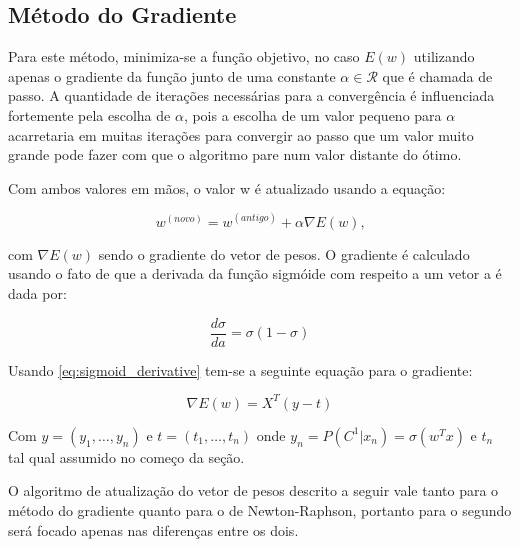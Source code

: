 \subsection{Método do Gradiente}\label{subsec:grad_descent}

Para este método, minimiza-se a função objetivo, no caso $E(w)$ utilizando apenas o gradiente
da função junto de uma constante $\alpha \in \mathcal{R}$ que é chamada de passo.
A quantidade de iterações necessárias para a convergência é influenciada fortemente pela
escolha de $\alpha$, pois a escolha de um valor pequeno para $\alpha$ acarretaria
em muitas iterações para convergir ao passo que um valor muito grande pode fazer
com que o algoritmo pare num valor distante do ótimo.

Com ambos valores em mãos, o valor w é atualizado usando
a equação:

\begin{center}
	\begin{equation}
		w^{ ( novo )} = w^{ (antigo) }  + \alpha \nabla E(w)\text{,}
	\end{equation}
\end{center}

com $\nabla E(w)$ sendo o gradiente do vetor de pesos. O gradiente é calculado usando o fato de que
a derivada da função sigmóide com respeito a um vetor a é dada por:

\begin{center}
	\begin{equation}
	\label{eq:sigmoid_derivative}
		\frac{d \sigma}{d a} = \sigma (1 - \sigma )
	\end{equation}
\end{center}

Usando \ref{eq:sigmoid_derivative} tem-se a seguinte equação para o gradiente:

\begin{center}
	\begin{equation}\label{eq:gradient}
		\nabla E(w) = X^T(y - t)
	\end{equation}
\end{center}

Com $y = (y_1, \ldots, y_n)$ e $t = (t_1, \ldots, t_n)$ onde
$y_n = P(C^1 | x_n) = \sigma(w^Tx)$ e $t_n$ tal qual assumido no começo da seção.

O algoritmo de atualização do vetor de pesos descrito a seguir vale tanto para o método
do gradiente quanto para o de Newton-Raphson, portanto para o segundo será focado apenas nas
diferenças entre os dois.


